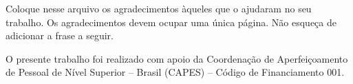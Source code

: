 Coloque nesse arquivo os agradecimentos àqueles que o ajudaram no seu trabalho. Os agradecimentos devem ocupar uma única página. Não esqueça de adicionar a frase a seguir.

O presente trabalho foi realizado com apoio da Coordenação de Aperfeiçoamento de Pessoal de Nível Superior -- Brasil (CAPES) -- Código de Financiamento 001.